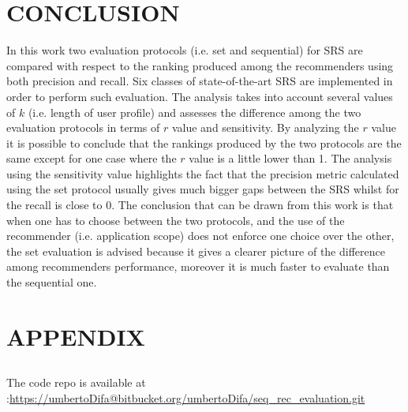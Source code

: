 \documentclass[prodmode,acmtecs]{acmsmall} %
\begin{document}
\section{CONCLUSION}
In this work two evaluation protocols (i.e. set and sequential) for SRS are compared with respect to the ranking produced among the recommenders using both precision and recall. Six classes of state-of-the-art SRS are implemented in order to perform such evaluation. The analysis takes into account several values of $k$ (i.e. length of user profile) and assesses the difference among the two evaluation protocols in terms of $r$ value and sensitivity. By analyzing the $r$ value it is possible to conclude that the rankings produced by the two protocols are the same except for one case where the $r$ value is a little lower than 1. The analysis using the sensitivity value highlights the fact that the precision metric calculated using the set protocol usually gives much bigger gaps between the SRS whilst for the recall is close to 0. The conclusion that can be drawn from this work is that when one has to choose between the two protocols, and the use of the recommender (i.e. application scope) does not enforce one choice over the other, the set evaluation is advised because it gives a clearer picture of the difference among recommenders performance, moreover it is much faster to evaluate than the sequential one.




\newpage
\section{APPENDIX}
\subsection{}
The code repo is available at :\href{https://umbertoDifa@bitbucket.org/umbertoDifa/seq_rec_evaluation.git}{https://umbertoDifa@bitbucket.org/umbertoDifa/seq\_rec\_evaluation.git}
\end{document}
